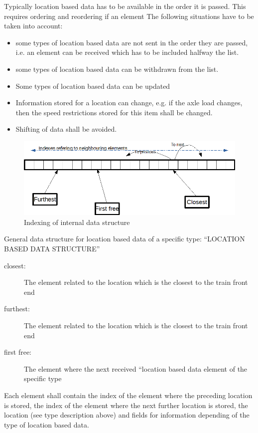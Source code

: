 \documentclass{template/openetcs_report}
\begin{document}
Typically location based data has to be available in the order it is passed. This requires ordering and reordering if an element The following situations have to be taken into account:
\begin{itemize}
\item some types of location based data are not sent in the order they are passed, i.e. an element can be received which has to be included halfway the list.
\item some types of location based data can be withdrawn from the list.
\item Some types of location based data can be updated
\item Information stored for a location can change, e.g. if the axle load changes, then the speed restrictions stored for this item shall be changed.
\item Shifting of data shall be avoided.
\end{itemize}

\begin{figure}[hbtp]
\centering
\includegraphics[angle=0, scale=0.6] {images/indexing_of_ringbuffer.png}
\caption{Indexing of internal data structure}
\end{figure}


General data structure for location based data of a specific type: “LOCATION BASED DATA STRUCTURE”
\begin{description}
\item[closest:] The element related to the location which is the closest to the train front end
\item[furthest:] The element related to the location which is the closest to the train front end
\item[first free:] The element where the next received “location based data element of the specific type
\end{description}

Each element shall contain the index of the element where the preceding location is stored,  the index of the element where the next further location is stored, the location (see type description above) and fields for information depending of the type of location based data.
\end{document}
